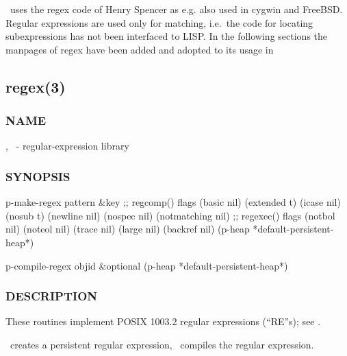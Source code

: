 \plob\ uses the regex code of Henry Spencer as e.g. also used in
cygwin and FreeBSD. Regular expressions are used only for matching,
i.e.\ the code for locating subexpressions has not been interfaced to
LISP. In the following sections the manpages of regex have been added
and adopted to its usage in \plob

\subsection{regex(3)}%
\label{sec:manre3}

\subsubsection{NAME}

, \ - regular-expression library

\subsubsection{SYNOPSIS}



\begin{CompactCode}
p-make-regex
  pattern
  &key
  ;; regcomp() flags
  (basic nil) (extended t) (icase nil) (nosub t) (newline nil)
  (nospec nil) (notmatching nil)
  ;; regexec() flags
  (notbol nil) (noteol nil)
  (trace nil) (large nil) (backref nil)
  (p-heap *default-persistent-heap*)

p-compile-regex
  objid
  &optional (p-heap *default-persistent-heap*)
\end{CompactCode}
 
\subsubsection{DESCRIPTION}

These routines implement POSIX 1003.2 regular expressions (``RE''s);
see . 

\ creates a persistent regular expression,
\ compiles the regular expression.

